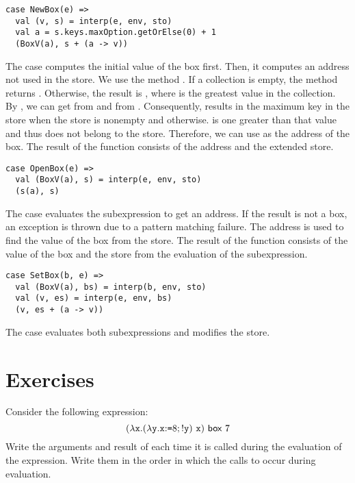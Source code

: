 \begin{verbatim}
case NewBox(e) =>
  val (v, s) = interp(e, env, sto)
  val a = s.keys.maxOption.getOrElse(0) + 1
  (BoxV(a), s + (a -> v))
\end{verbatim}

The  case computes the initial value of the box first. Then, it
computes an address not used in the store. We use the method .
If a collection is empty, the method returns . Otherwise, the
result is , where  is the greatest value in the collection.
By , we can get  from  and 
from . Consequently,  results
in the maximum key in the store when the store is nonempty and 
otherwise.  is one greater than that value and thus does not belong to
the store. Therefore, we can use  as the address of the box.
The result of the function consists of the address and the extended store.

\begin{verbatim}
case OpenBox(e) =>
  val (BoxV(a), s) = interp(e, env, sto)
  (s(a), s)
\end{verbatim}

The  case evaluates the subexpression to get an address.
If the result is not a box, an exception is thrown due to a pattern matching
failure. The address is used to find the value of the box from the store.
The result of the function consists of the value of the box and the store from
the evaluation of the subexpression.

\begin{verbatim}
case SetBox(b, e) =>
  val (BoxV(a), bs) = interp(b, env, sto)
  val (v, es) = interp(e, env, bs)
  (v, es + (a -> v))
\end{verbatim}

The  case evaluates both subexpressions and modifies the store.

\section{Exercises}

\begin{exercise}

Consider the following expression:
\[
  (\lambda\texttt{x}.(\lambda\texttt{y}.\texttt{x}{:}\texttt{=}8;!\texttt{y})\ \texttt{x})\ \textsf{box}\ 7
\]
Write the arguments and result of  each time it is called
during the evaluation of the expression. Write them in the order in
which the calls to  occur during evaluation.

\end{exercise}

